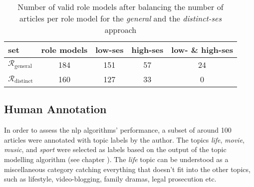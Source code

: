 \begin{table}
    \centering
    \begin{tabular}{lcccc}
        \toprule 
        set & role models & low-\gls{ses} & high-\gls{ses} & low- \& high-\gls{ses} \\ \toprule 
        $\mathcal{R}_\text{general}$ & \SI{184}{} & \SI{151}{} & \SI{57}{} & \SI{24}{} \\
        $\mathcal{R}_\text{distinct}$ & \SI{160}{} & \SI{127}{} & \SI{33}{} & \SI{0}{} \\
        \bottomrule
    \end{tabular}
    \caption{Number of valid role models after balancing the number of articles per role model for the \textit{general} and the \textit{distinct-\gls{ses}} approach}
    \label{tab:role_models_after_balancing}
\end{table}

\subsection*{Human Annotation}
In order to assess the \gls{nlp} algorithms' performance, a subset of around \SI{100}{} articles were annotated with topic labels by the author. The topics \textit{life}, \textit{movie}, \textit{music}, and \textit{sport} were selected as labels based on the output of the topic modelling algorithm (see chapter ). The \textit{life} topic can be understood as a miscellaneous category catching everything that doesn't fit into the other topics, such as lifestyle, video-blogging, family dramas, legal prosecution etc.

